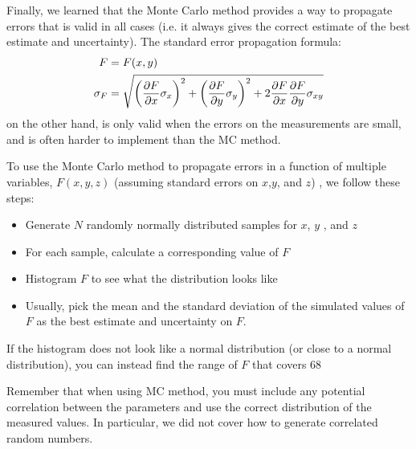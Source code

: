 Finally, we learned that the Monte Carlo method provides a way to propagate errors that is valid in all cases (i.e. it always gives the correct estimate of the best estimate and uncertainty). The standard error propagation formula:
\begin{align*}
F&=F(x,y)\\
\sigma_{F} &= \sqrt{\left(\frac{\partial F}{\partial x}\sigma_x\right)^2 + \left(\frac{\partial F}{\partial y} \sigma_y\right)^2+2\frac{\partial F}{\partial x}\frac{\partial F}{\partial y}\sigma_{xy}}
\end{align*}
on the other hand, is only valid when the errors on the measurements are small, and is often harder to implement than the MC method.

To use the Monte Carlo method to propagate errors in a function of multiple variables, $F(x,y,z)$ (assuming standard errors on $x$,$ y$, and $z$) , we follow these steps:
\begin{itemize}
\item Generate $N$ randomly normally distributed samples for  $x$, $y$ , and $z$
\item For each sample, calculate a corresponding value of $F$
\item Histogram $F$ to see what the distribution looks like
\item Usually, pick the mean and the standard deviation of the simulated values of $F$ as the best estimate and uncertainty on $F$.
\end{itemize}
If the histogram does not look like a normal distribution (or close to a normal distribution), you can instead find the range of $F$ that covers 68%

Remember that when using MC method, you must include any potential correlation between the parameters and use the correct distribution of the measured values. In particular, we did not cover how to generate correlated random numbers.


